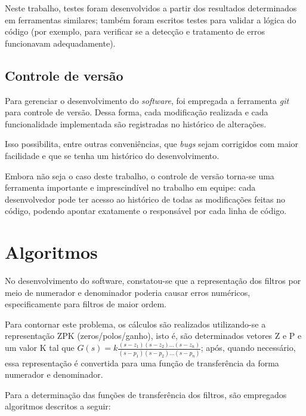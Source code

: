Neste trabalho, testes foram desenvolvidos a partir dos resultados determinados em ferramentas similares; também foram escritos testes para validar a lógica do código (por exemplo, para verificar se a detecção e tratamento de erros funcionavam adequadamente).

\subsection{Controle de versão}

Para gerenciar o desenvolvimento do \textit{software}, foi empregada a ferramenta \textit{git} para controle de versão. Dessa forma, cada modificação realizada e cada funcionalidade implementada são registradas no histórico de alterações.

Isso possibilita, entre outras conveniências, que \textit{bugs} sejam corrigidos com maior facilidade e que se tenha um histórico do desenvolvimento.

Embora não seja o caso deste trabalho, o controle de versão torna-se uma ferramenta importante e imprescindível no trabalho em equipe: cada desenvolvedor pode ter acesso ao histórico de todas as modificações feitas no código, podendo apontar exatamente o responsável por cada linha de código.

\section{Algoritmos}

No desenvolvimento do software, constatou-se que a representação dos filtros por meio de numerador e denominador poderia causar erros numéricos, especificamente para filtros de maior ordem. 

Para contornar este problema, os cálculos são realizados utilizando-se a representação ZPK (zeros/polos/ganho), isto é, são determinados vetores Z e P e um valor K tal que $G(s) = k \frac{(s - z_1) (s-z_2) \dots (s - z_n)}{(s - p_1)(s - p_2) \dots (s - p_n)}$; após, quando necessário, essa representação é convertida para uma função de transferência da forma numerador e denominador.

Para a determinação das funções de transferência dos filtros, são empregados algoritmos descritos a seguir:

